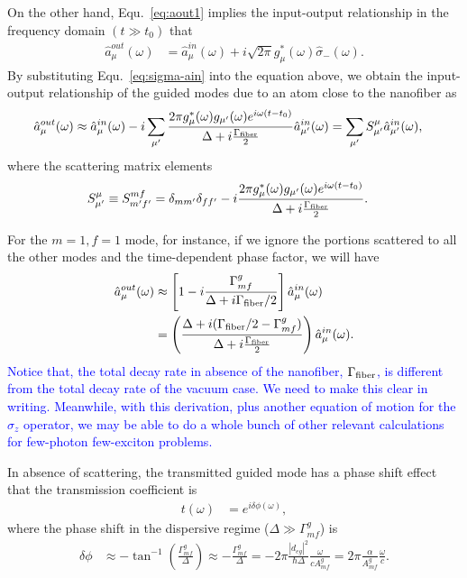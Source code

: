 \documentclass[preprint,aps,pra,onecolumn]{revtex4-1} %
\begin{document}
On the other hand, Equ.~\ref{eq:aout1} implies the input-output relationship in the frequency domain $(t\gg t_0)$ that
\begin{align}
\hat{a}^{out}_\mu(\omega ) &= \hat{a}^{in}_\mu(\omega) +i \sqrt{2\pi}g_\mu^*(\omega)\hat{\sigma}_-(\omega). 
\end{align}
By substituting Equ.~\ref{eq:sigma-ain} into the equation above, we obtain the input-output relationship of the guided modes due to an atom close to the nanofiber as
\begin{align}
\hat{a}^{out}_\mu(\omega) &\approx \hat{a}^{in}_\mu (\omega) -i\sum_{\mu'}\frac{2\pi g_\mu^*(\omega)g_{\mu'}(\omega)e^{i\omega(t-t_0)}}{\Delta+i\frac{\Gamma_{\rm fiber}}{2}}\hat{a}^{in}_{\mu'}(\omega)=\sum_{\mu'}S^\mu_{\mu'}\hat{a}^{in}_{\mu'}(\omega),
\end{align}
where the scattering matrix elements
\begin{align}\label{eq:Smfmft}
S^\mu_{\mu'} &\equiv S^{mf}_{m'f'}=\delta_{mm'}\delta_{ff'}-i\frac{2\pi g_\mu^*(\omega)g_{\mu'}(\omega)e^{i\omega(t-t_0)}}{\Delta+i\frac{\Gamma_{\rm fiber}}{2}}.
\end{align}

For the $m=1,f=1$ mode, for instance, if we ignore the portions scattered to all the other modes and the time-dependent phase factor, we will have 
\begin{align}
\hat{a}_{\mu}^{out}(\omega) &\approx \left[ 1- i\frac{\Gamma^g_{mf}}{\Delta+i\Gamma_{\rm fiber}/2}\right] \hat{a}^{in}_\mu(\omega) \\
&= \left(\frac{\Delta+i(\Gamma_{\rm fiber}/2-\Gamma^g_{mf})}{\Delta+i\frac{\Gamma_{\rm fiber}}{2}} \right)\hat{a}^{in}_\mu(\omega).
\end{align}
\textcolor{blue}{Notice that, the total decay rate in absence of the nanofiber, $\Gamma_{\rm fiber}$, is different from the total decay rate of the vacuum case. We need to make this clear in writing. Meanwhile, with this derivation, plus another equation of motion for the $\hat{\sigma}_z$ operator, we may be able to do a whole bunch of other relevant calculations for few-photon few-exciton problems. }

In absence of scattering, the transmitted guided mode has a phase shift effect that 
the transmission coefficient is
\begin{align}
t(\omega) &= e^{i\delta \phi(\omega)},
\end{align}
where the phase shift in the dispersive regime ($\Delta\gg \Gamma^g_{mf}$) is 
\begin{align}
\delta\phi &\approx -\tan^{-1}\left(\frac{\Gamma^g_{mf}}{\Delta} \right)\approx -\frac{\Gamma^g_{mf}}{\Delta}=-2\pi \frac{|d_{eg}|^2}{\hbar\Delta}\frac{\omega}{cA^g_{mf}}=2\pi \frac{\alpha}{A^g_{mf}}\frac{\omega}{c}.
\end{align}
\end{document}
